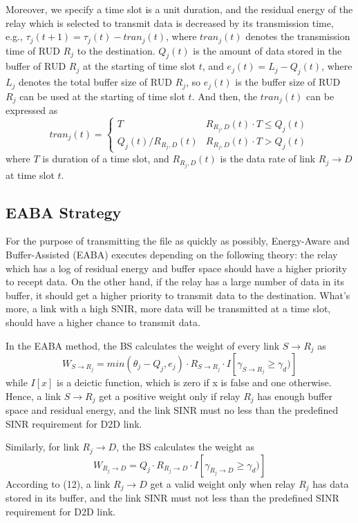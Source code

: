 \documentclass[conference]{IEEEtran}
\begin{document}
Moreover, we specify a time slot is a unit duration, and the residual energy of the relay which is selected to transmit data is decreased by its transmission time, e.g., $\tau_j(t+1) = \tau_j(t) - tran_j(t)$, where $tran_j(t)$ denotes the transmission time of RUD $R_j$ to the destination. $Q_j(t)$ is the amount of data stored in the buffer of RUD $R_j$ at the starting of time slot $t$, and $e_j(t) = L_j -  Q_j(t)$, where $L_j$ denotes the total buffer size of RUD $R_j$, so $e_j(t)$ is the buffer size of RUD $R_j$ can be used at the starting of time slot $t$. And then, the $tran_j(t)$ can be expressed as
\begin{equation}
tran_j(t) = \begin{cases}T & R_{R_j,D}(t)\cdot T \leq Q_j(t)\\Q_j(t)/R_{R_j,D}(t) & R_{R_j,D}(t)\cdot T > Q_j(t)\end{cases}
\end{equation}
where $T$ is duration of a time slot, and $R_{R_j,D}(t)$ is the data rate of link $R_j \rightarrow D$ at time slot $t$.

\subsection{EABA Strategy}
For the purpose of transmitting the file as quickly as possibly, Energy-Aware and Buffer-Assisted (EABA) executes depending on the following theory: the relay which has a log of residual energy and buffer space should  have a higher priority to recept data. On the other hand, if the relay has a large number of data in its buffer, it should get a higher priority to transmit data to the destination. What's more, a link with a high SNIR, more data will be transmitted at a time slot, should have a higher chance to transmit data.

In the EABA method, the BS calculates the weight of every link $S \rightarrow R_j$ as
\begin{equation}
W_{S\rightarrow R_j} = min(\theta_j - Q_j,e_j) \cdot R_{S\rightarrow R_j} \cdot I[\gamma_{S\rightarrow R_j} \geq \gamma_d)]
\end{equation}
while $I[x]$ is a deictic function, which is zero if x is false and one otherwise. Hence, a link $S \rightarrow R_j$ get a positive weight only if relay $R_j$ has enough buffer space and residual energy, and the link SINR must no less than the predefined SINR requirement for D2D link.

Similarly, for link $R_j \rightarrow D$, the BS calculates the weight as
\begin{equation}
W_{R_j \rightarrow D} = Q_j \cdot R_{R_j \rightarrow D} \cdot I[\gamma_{R_j \rightarrow D} \geq \gamma_d)]
\end{equation}
According to (12), a link $R_j \rightarrow D$ get a valid weight only when relay $R_j$ has data stored in its buffer, and the link SINR must not less than the predefined SINR requirement for D2D link.
\end{document}
